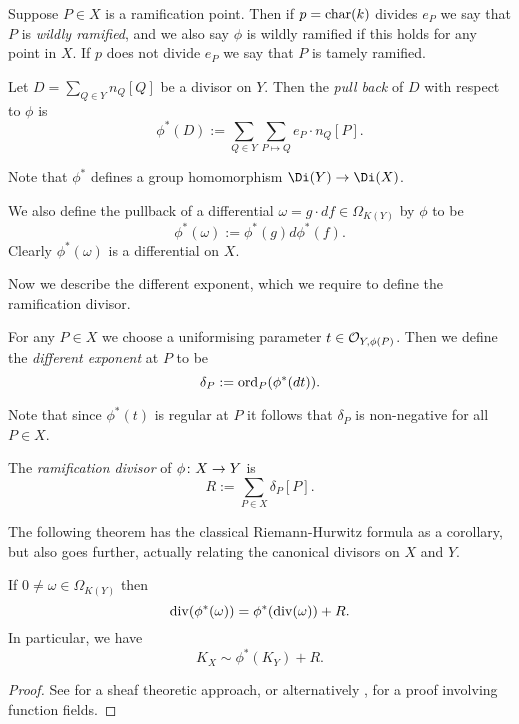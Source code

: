     
Suppose $P \in X$ is a ramification point.
Then if $p = \operatorname{char}(k)$ divides $e_P$ we say that $P$ is \emph{wildly ramified}, and we also say $\phi$ is wildly ramified if this holds for any point in $X$.
If $p$ does not divide $e_P$ we say that $P$ is tamely ramified.

    \begin{defn}
    Let $D = \sum_{Q \in Y}n_Q [Q]$ be a divisor on $Y$.
    Then the \emph{pull back} of $D$ with respect to $\phi$ is
        \[
        \phi^*(D) := \sum_{Q \in Y} \sum_{P \mapsto Q} e_P \cdot n_Q [P].
        \]
    \end{defn}

Note that $\phi^*$ defines a group homomorphism $\Di(Y) \ra \Di(X)$.


We also define the pullback of a differential $\omega = g\cdot df \in \Omega_{K(Y)}$ by $\phi$ to be
    \[
    \phi^*(\omega) := \phi^*(g)d\phi^*(f).
    \]
Clearly $\phi^*(\omega)$ is a differential on $X$.


Now we describe the different exponent, which we require to define the ramification divisor.
    \begin{defn}\label{definitiondifferent}
    For any $P\in X$ we choose a uniformising parameter $t \in {\cal O}_{Y,\phi(P)}$.
    Then we define the \emph{different exponent} at $P$ to be 
        \[
        \delta_P : = \operatorname{ord}_P(\phi^*(dt)).
        \]
    \end{defn}

Note that since $\phi^*(t)$ is regular at $P$ it follows that $\delta_P$ is non-negative for all $P \in X$.
 
    \begin{defn}\label{defnramificationdivisor}
    The \emph{ramification divisor} of $\phi \colon X \rightarrow Y$ is 
        \[
        R:= \sum_{P \in X} \delta_P [P].
        \]
    \end{defn}

The following theorem has the classical Riemann-Hurwitz formula as a corollary, but also goes further, actually relating the canonical divisors on $X$ and $Y$.
    \begin{thm}\label{theoremdetailedhurwitz}
    If $0 \neq \omega \in \Omega_{K(Y)}$ then
        \begin{equation}\label{equationstronghurwitzformula}
        \operatorname{div}(\phi^*(\omega)) = \phi^*(\operatorname{div}(\omega)) + R.
        \end{equation}
    In particular, we have
        \[
        K_X \sim \phi^*(K_Y) + R.
        \]
    \end{thm}
    \begin{proof}
    See \cite[Chap.\ IV, \S 2, Prop.\ 2.3]{hart} for a sheaf theoretic approach, or alternatively \cite[Thm. 3.4.6]{stichtenoth}, for a proof involving function fields.
    \end{proof}


